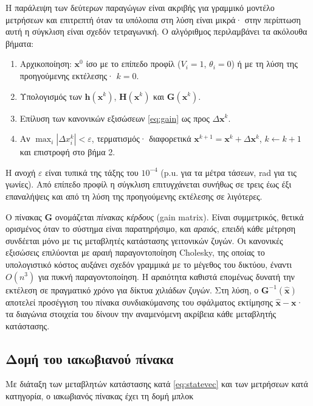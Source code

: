 Η παράλειψη των δεύτερων παραγώγων είναι ακριβής για γραμμικό μοντέλο μετρήσεων και
επιτρεπτή όταν τα υπόλοιπα στη λύση είναι μικρά· στην περίπτωση αυτή η σύγκλιση είναι σχεδόν
τετραγωνική. Ο αλγόριθμος περιλαμβάνει τα ακόλουθα βήματα:

\begin{enumerate}
\item Αρχικοποίηση: $\mathbf{x}^{0}$ ίσο με το επίπεδο προφίλ ($V_i = 1$, $\theta_i = 0$) ή
      με τη λύση της προηγούμενης εκτέλεσης· $k = 0$.
\item Υπολογισμός των $\mathbf{h}(\mathbf{x}^{k})$, $\mathbf{H}(\mathbf{x}^{k})$ και
      $\mathbf{G}(\mathbf{x}^{k})$.
\item Επίλυση των κανονικών εξισώσεων \eqref{eq:gain} ως προς $\Delta\mathbf{x}^{k}$.
\item Αν $\max_i |\Delta x_i^{k}| < \varepsilon$, τερματισμός· διαφορετικά
      $\mathbf{x}^{k+1} = \mathbf{x}^{k} + \Delta\mathbf{x}^{k}$, $k \leftarrow k + 1$ και
      επιστροφή στο βήμα 2.
\end{enumerate}

Η ανοχή $\varepsilon$ είναι τυπικά της τάξης του $10^{-4}$ (p.u. για τα μέτρα τάσεων, rad για
τις γωνίες). Από επίπεδο προφίλ η σύγκλιση επιτυγχάνεται συνήθως σε τρεις έως έξι επαναλήψεις
και από τη λύση της προηγούμενης εκτέλεσης σε λιγότερες.

Ο πίνακας $\mathbf{G}$ ονομάζεται \emph{πίνακας κέρδους} (gain matrix). Είναι συμμετρικός,
θετικά ορισμένος όταν το σύστημα είναι παρατηρήσιμο, και \emph{αραιός}, επειδή κάθε μέτρηση
συνδέεται μόνο με τις μεταβλητές κατάστασης γειτονικών ζυγών. Οι κανονικές εξισώσεις
επιλύονται με αραιή παραγοντοποίηση Cholesky, της οποίας το υπολογιστικό κόστος αυξάνει
σχεδόν γραμμικά με το μέγεθος του δικτύου, έναντι $O(n^3)$ για πυκνή παραγοντοποίηση. Η
αραιότητα καθιστά επομένως δυνατή την εκτέλεση σε πραγματικό χρόνο για δίκτυα χιλιάδων
ζυγών. Στη λύση, ο $\mathbf{G}^{-1}(\hat{\mathbf{x}})$ αποτελεί προσέγγιση του πίνακα
συνδιακύμανσης του σφάλματος εκτίμησης $\hat{\mathbf{x}} - \mathbf{x}$· τα διαγώνια στοιχεία
του δίνουν την αναμενόμενη ακρίβεια κάθε μεταβλητής κατάστασης.

\subsection{Δομή του ιακωβιανού πίνακα}

Με διάταξη των μεταβλητών κατάστασης κατά \eqref{eq:statevec} και των μετρήσεων κατά
κατηγορία, ο ιακωβιανός πίνακας έχει τη δομή μπλοκ

